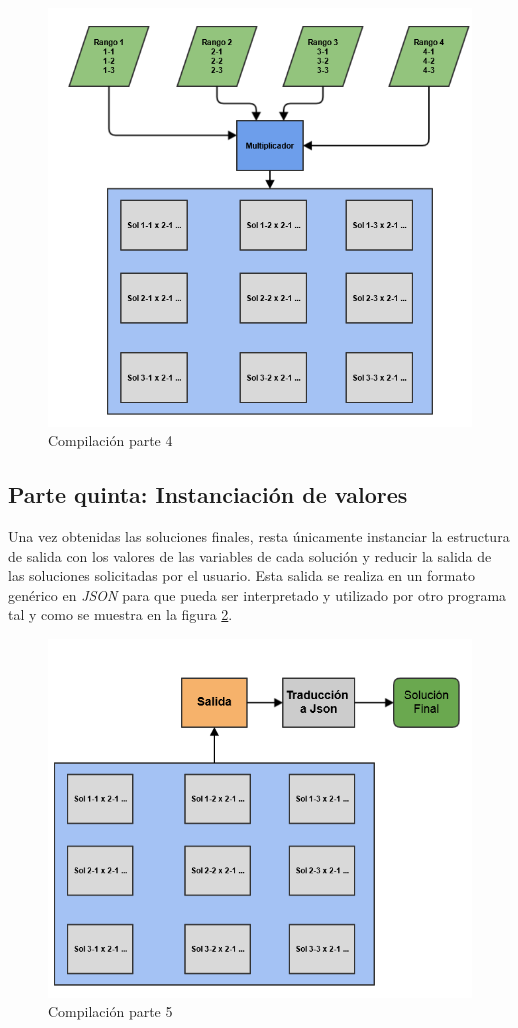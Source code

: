 \begin{figure}[h]
	\begin{center}
		\includegraphics[scale=0.5]{imagenes/Compilacion_parte_4.png}
	\end{center}
	\caption{
		\label{fig:compilacion_part_4}
		Compilación parte 4
	}
\end{figure}

\subsection{Parte quinta: Instanciación de valores}
Una vez obtenidas las soluciones finales, resta únicamente instanciar la 
estructura de salida con los valores de las variables de cada solución y reducir
la salida de las soluciones solicitadas por el usuario. Esta salida se realiza en un 
formato genérico en \emph{JSON} para que pueda ser interpretado y utilizado por 
otro programa tal y como se muestra en la figura \ref{fig:compilacion_part_5}.

\begin{figure}[h]
	\begin{center}
		\includegraphics[scale=0.5]{imagenes/Compilacion_parte_5.png}
	\end{center}
	\caption{
		\label{fig:compilacion_part_5}
		Compilación parte 5
	}
\end{figure}
